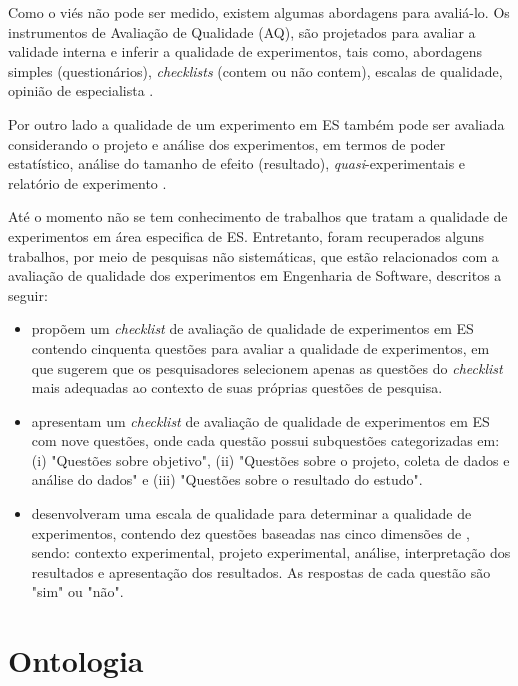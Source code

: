 Como o viés não pode ser medido, existem algumas abordagens para avaliá-lo. Os instrumentos de Avaliação de Qualidade (AQ), são projetados para avaliar a validade interna e inferir a qualidade de experimentos, tais como, abordagens simples (questionários), \textit{checklists} (contem ou não contem), escalas de qualidade, opinião de especialista \cite{dieste2011systematic,dieste2013challenges,teixeira2014analise}.

Por outro lado a qualidade de um experimento em ES também pode ser avaliada considerando o projeto e análise dos experimentos, em termos de poder estatístico, análise do tamanho de efeito (resultado), \textit{quasi}-experimentais e relatório de experimento \cite{kampenes2007quality}.

Até o momento não se tem conhecimento de trabalhos que tratam a qualidade de experimentos em área especifica de ES. Entretanto, foram recuperados alguns trabalhos, por meio de pesquisas não sistemáticas, que estão relacionados com a avaliação de qualidade dos experimentos em Engenharia de Software, descritos a seguir:

\begin{itemize}
	\item \citet{kitchenham2007large} propõem um \textit{checklist} de avaliação de qualidade de experimentos em ES contendo cinquenta questões para avaliar a qualidade de experimentos, em que sugerem que os pesquisadores selecionem apenas as questões do \textit{checklist} mais adequadas ao contexto de suas próprias questões de pesquisa.
	
	\item \citet{kitchenham2015evidence} apresentam um \textit{checklist} de avaliação de qualidade de experimentos em ES com nove questões, onde cada questão possui subquestões	categorizadas em: (i) "Questões sobre objetivo", (ii) "Questões sobre o projeto, coleta de dados e análise do dados" e (iii) "Questões sobre o resultado do estudo".
	
	\item \citet{dieste2011systematic}  desenvolveram uma escala de qualidade para determinar a qualidade de experimentos, contendo dez questões baseadas nas cinco dimensões de \citet{kitchenham2007large}, sendo: contexto experimental, projeto experimental, análise, interpretação dos resultados e apresentação dos resultados. As respostas de cada questão são "sim" ou "não".	
\end{itemize}


\section{Ontologia}
\label{sec:ontologia}

